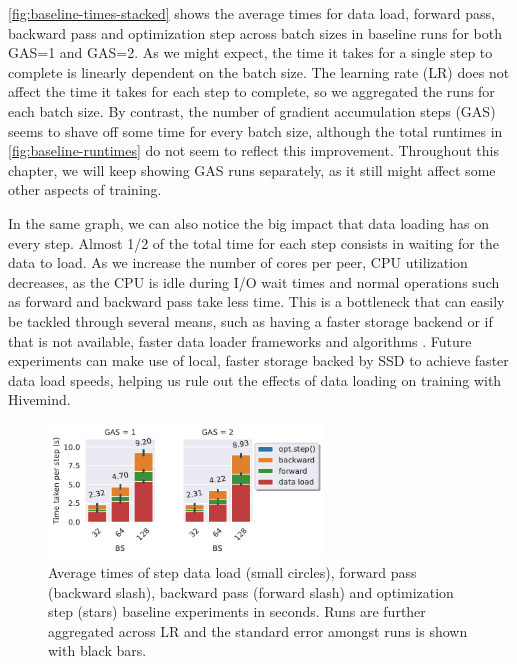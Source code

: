 \autoref{fig:baseline-times-stacked} shows the average times for data load, forward pass, backward pass and optimization step across batch sizes in baseline runs for both GAS=1 and GAS=2.
As we might expect, the time it takes for a single step to complete is linearly dependent on the batch size.
The learning rate (LR) does not affect the time it takes for each step to complete, so we aggregated the runs for each batch size.
By contrast, the number of gradient accumulation steps (GAS) seems to shave off some time for every batch size, although the total runtimes in \autoref{fig:baseline-runtimes} do not seem to reflect this improvement.
Throughout this chapter, we will keep showing GAS runs separately, as it still might affect some other aspects of training.

In the same graph, we can also notice the big impact that data loading has on every step.
Almost 1/2 of the total time for each step consists in waiting for the data to load.
As we increase the number of cores per peer, CPU utilization decreases, as the CPU is idle during I/O wait times and normal operations such as forward and backward pass take less time.
This is a bottleneck that can easily be tackled through several means, such as having a faster storage backend or if that is not available, faster data loader frameworks and algorithms \cite{isenko2022bottleneck, leclerc2022ffcv}.
Future experiments can make use of local, faster storage backed by SSD to achieve faster data load speeds, helping us rule out the effects of data loading on training with Hivemind.

\begin{figure}[h]
    \centering
    \includegraphics[width=0.65\textwidth]{./figures/06_barplot-times_baseline-16vCPUs-GAS-1.pdf}
    \caption{
        Average times of step data load (small circles), forward pass (backward slash), backward pass (forward slash) and optimization step (stars) baseline experiments in seconds.
        Runs are further aggregated across LR and the standard error amongst runs is shown with black bars.
    }
    \label{fig:baseline-times-stacked}
\end{figure}








